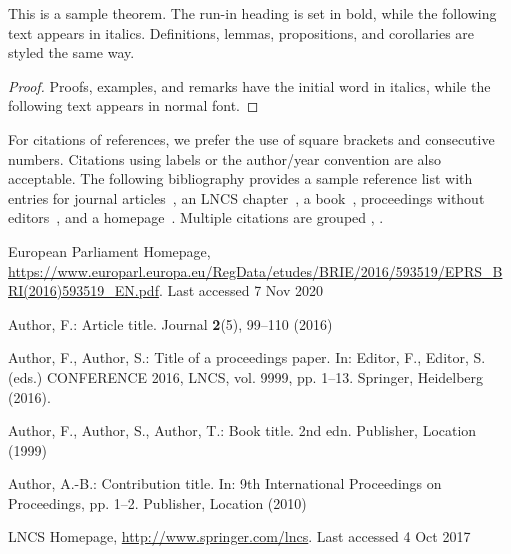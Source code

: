 \documentclass[runningheads]{llncs}
\begin{document}
\begin{theorem}
This is a sample theorem. The run-in heading is set in bold, while
the following text appears in italics. Definitions, lemmas,
propositions, and corollaries are styled the same way.
\end{theorem}
%
%
\begin{proof}
Proofs, examples, and remarks have the initial word in italics,
while the following text appears in normal font.
\end{proof}
For citations of references, we prefer the use of square brackets
and consecutive numbers. Citations using labels or the author/year
convention are also acceptable. The following bibliography provides
a sample reference list with entries for journal
articles~\cite{ref_article1}, an LNCS chapter~\cite{ref_lncs1}, a
book~\cite{ref_book1}, proceedings without editors~\cite{ref_proc1},
and a homepage~\cite{ref_url1}. Multiple citations are grouped
\cite{ref_article1,ref_lncs1,ref_book1},
\cite{ref_article1,ref_book1,ref_proc1,ref_url1}.
%
%
%
% 
% 
%
\begin{thebibliography}{8}
European Parliament Homepage, \url{https://www.europarl.europa.eu/RegData/etudes/BRIE/2016/593519/EPRS\_BRI(2016)593519\_EN.pdf}. Last accessed 7 Nov 2020

Author, F.: Article title. Journal \textbf{2}(5), 99--110 (2016)

Author, F., Author, S.: Title of a proceedings paper. In: Editor,
F., Editor, S. (eds.) CONFERENCE 2016, LNCS, vol. 9999, pp. 1--13.
Springer, Heidelberg (2016). 

Author, F., Author, S., Author, T.: Book title. 2nd edn. Publisher,
Location (1999)

Author, A.-B.: Contribution title. In: 9th International Proceedings
on Proceedings, pp. 1--2. Publisher, Location (2010)

LNCS Homepage, \url{http://www.springer.com/lncs}. Last accessed 4
Oct 2017
\end{thebibliography}
\end{document}
